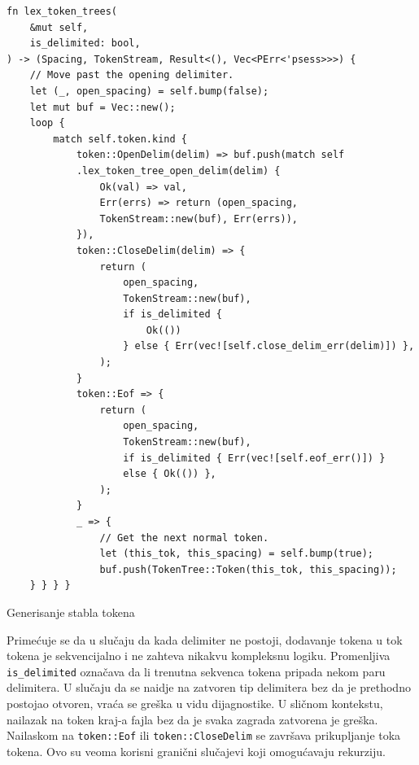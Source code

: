 \documentclass[11pt]{article}
\begin{document}
\begin{listing}[H]
\begin{verbatim}
fn lex_token_trees(
    &mut self,
    is_delimited: bool,
) -> (Spacing, TokenStream, Result<(), Vec<PErr<'psess>>>) {
    // Move past the opening delimiter.
    let (_, open_spacing) = self.bump(false);
    let mut buf = Vec::new();
    loop {
        match self.token.kind {
            token::OpenDelim(delim) => buf.push(match self
            .lex_token_tree_open_delim(delim) {
                Ok(val) => val,
                Err(errs) => return (open_spacing, 
                TokenStream::new(buf), Err(errs)),
            }),
            token::CloseDelim(delim) => {
                return (
                    open_spacing,
                    TokenStream::new(buf),
                    if is_delimited { 
                        Ok(()) 
                    } else { Err(vec![self.close_delim_err(delim)]) },
                );
            }
            token::Eof => {
                return (
                    open_spacing,
                    TokenStream::new(buf),
                    if is_delimited { Err(vec![self.eof_err()]) } 
                    else { Ok(()) },
                );
            }
            _ => {
                // Get the next normal token.
                let (this_tok, this_spacing) = self.bump(true);
                buf.push(TokenTree::Token(this_tok, this_spacing));
    } } } }
\end{verbatim}
\caption{Generisanje stabla tokena}
\end{listing}

\newpage

Primećuje se da u slučaju da kada delimiter ne postoji, dodavanje tokena u tok tokena 
je sekvencijalno i ne zahteva nikakvu kompleksnu logiku. Promenljiva \verb|is_delimited|
označava da li trenutna sekvenca tokena pripada nekom paru delimitera. U slučaju da 
se naidje na zatvoren tip delimitera bez da je prethodno postojao otvoren, vraća se greška
u vidu dijagnostike. U sličnom kontekstu, nailazak na token kraj-a fajla bez da je svaka 
zagrada zatvorena je greška. 
Nailaskom na \verb|token::Eof| ili \verb|token::CloseDelim| se završava prikupljanje toka tokena.
Ovo su veoma korisni granični slučajevi koji omogućavaju rekurziju. 
\end{document}
